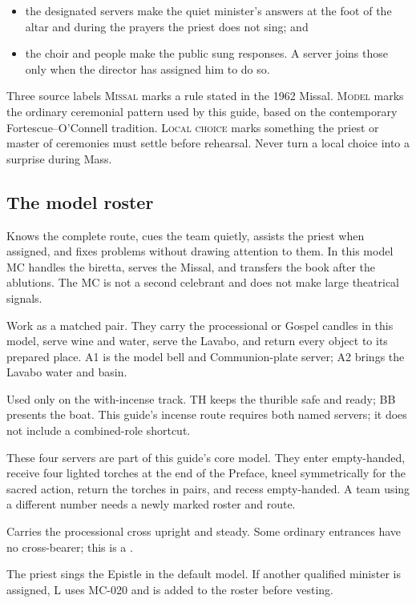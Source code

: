 \begin{itemize}
  \item the designated servers make the quiet minister's answers at the foot of
  the altar and during the prayers the priest does not sing; and
  \item the choir and people make the public sung responses. A server joins
  those only when the director has assigned him to do so.
\end{itemize}

\begin{watchbox}{Three source labels}
\textsc{Missal} marks a rule stated in the 1962 Missal. \textsc{Model} marks
the ordinary ceremonial pattern used by this guide, based on the contemporary
Fortescue--O'Connell tradition. \textsc{Local choice} marks something the
priest or master of ceremonies must settle before rehearsal. Never turn a local
choice into a surprise during Mass.
\end{watchbox}

\subsection{The model roster}

\begingroup
\renewcommand{\rolecard}[2]{\item[\textbf{#1}] #2}
\begin{description}[leftmargin=0pt,labelindent=0pt,labelwidth=0pt,labelsep=0pt,style=nextline,
  topsep=0.2em,itemsep=0.25em]
\rolecard{MC --- master of ceremonies}{Knows the complete route, cues the
team quietly, assists the priest when assigned, and fixes problems without
drawing attention to them. In this model MC handles the biretta, serves the
Missal, and transfers the book after the ablutions. The MC is not a second
celebrant and does not make large theatrical signals.}
\rolecard{A1 and A2 --- acolytes}{Work as a matched pair. They carry the
processional or Gospel candles in this model, serve wine and water, serve the
Lavabo, and return every object to its prepared place. A1 is the model bell
and Communion-plate server; A2 brings the Lavabo water and basin.}
\rolecard{TH and BB --- thurifer and boat bearer}{Used only on the
with-incense track. TH keeps the thurible safe and ready; BB presents the boat.
This guide's incense route requires both named servers; it does not include a
combined-role shortcut.}
\rolecard{T1--T4 --- torchbearers}{These four servers are part of this guide's
core model. They enter empty-handed, receive four lighted torches at the end of
the Preface, kneel symmetrically for the sacred action, return the torches in
pairs, and recess empty-handed. A team using a different number needs a newly
marked roster and route.}
\rolecard{CB --- cross-bearer, when used}{Carries the processional cross
upright and steady. Some ordinary entrances have no cross-bearer; this is a
\LocalChoice.}
\rolecard{L --- assigned lesson singer, alternate branch}{The priest sings the
Epistle in the default model. If another qualified minister is assigned, L
uses MC-020 and is added to the roster before vesting.}
\end{description}
\endgroup

